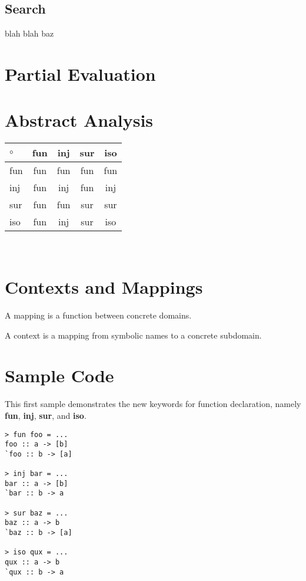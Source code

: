 \documentclass[11pt]{amsart}
\renewcommand{\b}[1]{\textbf{#1}}
\begin{document}
\subsection*{Search}

blah blah baz


\section*{Partial Evaluation}



\section*{Abstract Analysis}

\begin{tabular}{|l||c|c|c|c|}\hline
$\circ$ & fun & inj & sur & iso\\\hline\hline
fun & fun & fun & fun & fun\\\hline
inj & fun & inj & fun & inj\\\hline
sur & fun & fun & sur & sur\\\hline
iso & fun & inj & sur & iso\\\hline
\end{tabular}\\


\section*{Contexts and Mappings}

A mapping is a function between concrete domains.

A context is a mapping from symbolic names to a concrete subdomain.

\clearpage
\section*{Sample Code}

This first sample demonstrates the new keywords for function declaration, namely \b{fun}, \b{inj}, \b{sur}, and \b{iso}.\\

\begin{verbatim}
> fun foo = ...
foo :: a -> [b]
`foo :: b -> [a]

> inj bar = ...
bar :: a -> [b]
`bar :: b -> a

> sur baz = ...
baz :: a -> b
`baz :: b -> [a]

> iso qux = ...
qux :: a -> b
`qux :: b -> a
\end{verbatim}
\end{document}
